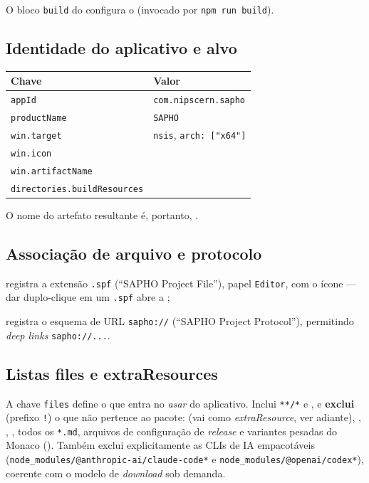 O bloco \texttt{build} do  configura o 
(invocado por \lstinline|npm run build|).

\subsection{Identidade do aplicativo e alvo}

\begin{tabularx}{\linewidth}{l Y}
\toprule
\textbf{Chave} & \textbf{Valor} \\
\midrule
\texttt{appId}        & \lstinline|com.nipscern.sapho| \\
\texttt{productName}  & \texttt{SAPHO} \\
\texttt{win.target}   & \texttt{nsis}, \texttt{arch: ["x64"]} \\
\texttt{win.icon}     &  \\
\texttt{win.artifactName} &  \\
\texttt{directories.buildResources} &  \\
\bottomrule
\end{tabularx}

\noindent
O nome do artefato resultante é, portanto,
.

\subsection{Associação de arquivo e protocolo}

\begin{description}[nosep]
  \item[fileAssociations] registra a extensão \texttt{.spf}
        (\enquote{SAPHO Project File}), papel \texttt{Editor}, com o ícone
         --- dar duplo-clique em um \texttt{.spf}
        abre a ;
  \item[protocols] registra o esquema de URL \lstinline|sapho://| (\enquote{SAPHO
        Project Protocol}), permitindo \emph{deep links} \lstinline|sapho://...|.
\end{description}

\subsection{Listas files e extraResources}
\label{sec:16-files}

A chave \texttt{files} define o que entra no \emph{asar} do aplicativo. Inclui
\lstinline|**/*| e , e \textbf{exclui} (prefixo \lstinline|!|) o
que não pertence ao pacote:  (vai como \emph{extraResource},
ver adiante), , , , todos os
\texttt{*.md}, arquivos de configuração de \emph{release} e variantes pesadas do
Monaco (). Também exclui
explicitamente as CLIs de IA empacotáveis
(\lstinline|node_modules/@anthropic-ai/claude-code*| e
\lstinline|node_modules/@openai/codex*|), coerente com o modelo de
\emph{download} sob demanda.

